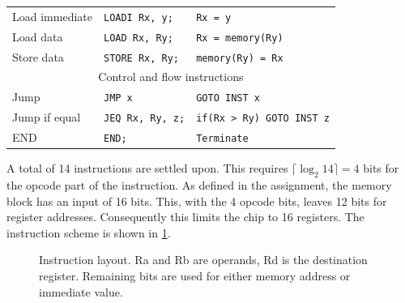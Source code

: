 \documentclass[a4paper, english]{article}
\numberwithin{equation}{section}
\begin{document}
\begin{table}
\begin{tabular}{lll}
        \midrule
        Load immediate           & \texttt{LOADI Rx, y;}    & \texttt{Rx = y}                  \\
        Load data                & \texttt{LOAD Rx, Ry;}    & \texttt{Rx = memory(Ry)}         \\
        Store data               & \texttt{STORE Rx, Ry;}   & \texttt{memory(Ry) = Rx}         \\
        \midrule
        \multicolumn{3}{c}{Control and flow instructions}                                      \\
        \midrule
        Jump                     & \texttt{JMP x}           & \texttt{GOTO INST x}             \\
        Jump if equal            & \texttt{JEQ Rx, Ry, z;}  & \texttt{if(Rx > Ry) GOTO INST z} \\
        END                      & \texttt{END;}            & \texttt{Terminate}               \\
        \bottomrule
    \end{tabular}
\end{table}
A total of 14 instructions are settled upon. This requires \(\lceil \log_2{14} \rceil = 4\) bits for the opcode part of the instruction. As defined in the assignment, the memory block has an input of 16 bits. This, with the 4 opcode bits, leaves 12 bits for register addresses. Consequently this limits the chip to 16 registers. The instruction scheme is shown in \cref{fig:inst}.
\begin{figure}
    \centering
    \centering
    \caption{Instruction layout. Ra and Rb are operands, Rd is the destination register. Remaining bits are used for either memory address or immediate value.}\label{fig:inst}
\end{figure}
\end{document}

